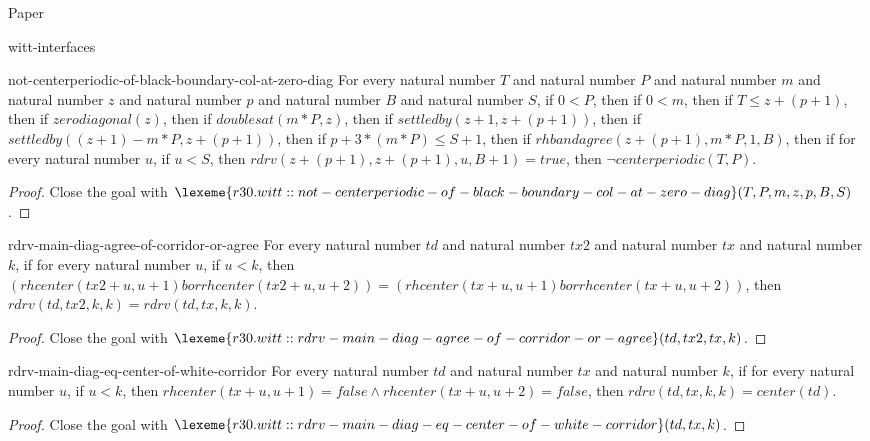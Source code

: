 \begin{lexlean}{Paper}
\begin{section}{witt-interfaces}
  \begin{theorem}{not-centerperiodic-of-black-boundary-col-at-zero-diag}
  For every natural number \(T\) and natural number \(P\) and natural number \(m\) and natural number \(z\) and natural number \(p\) and natural number \(B\) and natural number \(S\), if \(0 < P\), then if \(0 < m\), then if \(T ≤ z + (p + 1)\), then if \(zerodiagonal(z)\), then if \(doublesat(m * P, z)\), then if \(settledby(z + 1, z + (p + 1))\), then if \(settledby((z + 1) - m * P, z + (p + 1))\), then if \(p + 3 * (m * P) ≤ S + 1\), then if \(rhbandagree(z + (p + 1), m * P, 1, B)\), then if for every natural number \(u\), if \(u < S\), then \(rdrv(z + (p + 1), z + (p + 1), u, B + 1) = true\), then \(¬ centerperiodic(T, P)\).
  \begin{proof}
  Close the goal with \(\lexeme{r30.witt::not-centerperiodic-of-black-boundary-col-at-zero-diag}(T, P, m, z, p, B, S)\).
  \end{proof}
  \end{theorem}

  \begin{theorem}{rdrv-main-diag-agree-of-corridor-or-agree}
  For every natural number \(td\) and natural number \(tx2\) and natural number \(tx\) and natural number \(k\), if for every natural number \(u\), if \(u < k\), then \((rhcenter(tx2 + u, u + 1) bor rhcenter(tx2 + u, u + 2)) = (rhcenter(tx + u, u + 1) bor rhcenter(tx + u, u + 2))\), then \(rdrv(td, tx2, k, k) = rdrv(td, tx, k, k)\).
  \begin{proof}
  Close the goal with \(\lexeme{r30.witt::rdrv-main-diag-agree-of-corridor-or-agree}(td, tx2, tx, k)\).
  \end{proof}
  \end{theorem}

  \begin{theorem}{rdrv-main-diag-eq-center-of-white-corridor}
  For every natural number \(td\) and natural number \(tx\) and natural number \(k\), if for every natural number \(u\), if \(u < k\), then \(rhcenter(tx + u, u + 1) = false ∧ rhcenter(tx + u, u + 2) = false\), then \(rdrv(td, tx, k, k) = center(td)\).
  \begin{proof}
  Close the goal with \(\lexeme{r30.witt::rdrv-main-diag-eq-center-of-white-corridor}(td, tx, k)\).
  \end{proof}
  \end{theorem}


\end{section}
\end{lexlean}
